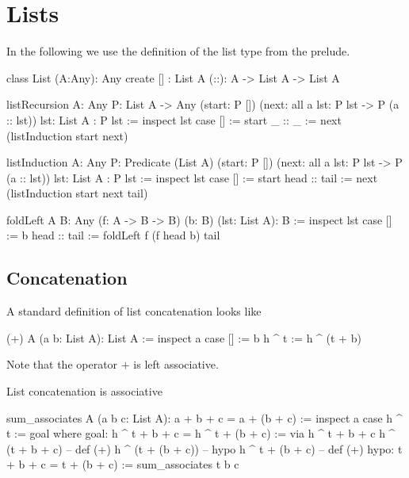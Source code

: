 \newpage
\section{Lists}
\label{sec:certprog-lists}


In the following we use the definition of the list type from the prelude.

\begin{alba}
    class
        List (A:Any): Any
    create
        [] : List A
        (::): A -> List A -> List A
\end{alba}


\begin{alba}
    listRecursion
        {A: Any}
        {P: List A -> Any}
        (start: P [])
        (next: all {a lst}: P lst -> P (a :: lst))
        {lst: List A}
        : P lst
    :=
        inspect lst case
            [] :=
                start
            _ :: _ :=
                next (listInduction start next)

    listInduction
        {A: Any}
        {P: Predicate (List A)}
        (start: P [])
        (next: all {a lst}: P lst -> P (a :: lst))
        {lst: List A}
        : P lst
    :=
        inspect lst case
            [] :=
                start
            head :: tail :=
                next (listInduction start next {tail})

    foldLeft {A B: Any} (f: A -> B -> B) (b: B) (lst: List A): B :=
        inspect lst case
            [] :=
                b
            head :: tail :=
                foldLeft f (f head b) tail
\end{alba}


\subsection{Concatenation}


A standard definition of list concatenation looks like

\begin{alba}
  (+) A (a b: List A): List A :=
    inspect a case
      [] :=
        b
      h ^ t :=
        h ^ (t + b)
\end{alba}
Note that the operator $+$ is left associative.


List concatenation is associative
%
\begin{alba}
  sum_associates A (a b c: List A): a + b + c = a + (b + c) :=
    inspect a case
      h ^ t :=
        goal where
          goal: h ^ t + b + c = h ^ t + (b + c) :=
            via
               h ^ t + b + c
               h ^ (t + b + c)      -- def (+)
               h ^ (t + (b + c))    -- hypo
               h ^ t + (b + c)      -- def (+)
          hypo: t + b + c = t + (b + c) :=
            sum_associates t b c
\end{alba}


